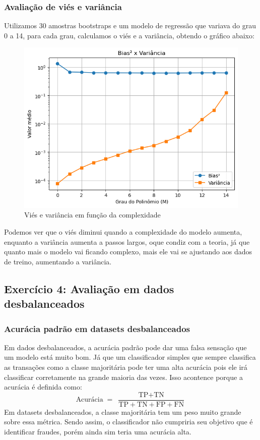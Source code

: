 \documentclass[conference]{IEEEtran}
\begin{document}
\subsubsection*{Avaliação de viés e variância}
Utilizamos 30 amostras bootstraps e um modelo de regressão que variava do grau 0 a 14, para cada grau, calculamos o viés e a variância, obtendo o gráfico abaixo:
\begin{figure}[H]
    \centerline{\includegraphics[width=1\linewidth]{../output/vies-variancia.png}}
    \caption{Viés e variância em função da complexidade}
    \label{fig:viasevariancia}
  \end{figure}
Podemos ver que o viés diminui quando a complexidade do modelo aumenta, enquanto a variância aumenta a passos largos, oque condiz com a teoria, já que quanto mais o modelo vai ficando complexo, mais ele vai se ajustando aos dados de treino, aumentando a variância.
\subsection{Exercício 4: Avaliação em dados desbalanceados}

\subsubsection{Acurácia padrão em datasets desbalanceados}
Em dados desbalanceados, a acurácia padrão pode dar uma falsa sensação que um modelo está muito bom. Já que um classificador simples que sempre classifica as transações como a classe majoritária pode ter uma alta acurácia pois ele irá classificar corretamente na grande maioria das vezes. Isso acontence porque a acurácia é definida como:
\[
\text{Acurácia} \;=\;
\frac{\text{TP} + \text{TN}}{\text{TP} + \text{TN} + \text{FP} + \text{FN}}
\]
Em datasets desbalanceados, a classe majoritária tem um peso muito grande sobre essa métrica. Sendo assim, o classificador não cumpriria seu objetivo que é identificar fraudes, porém  ainda sim teria uma acurácia alta.
\end{document}

